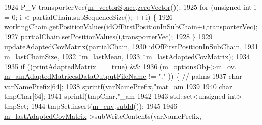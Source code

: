 \begin{DoxyCode}
1924         P\_V transporterVec(\hyperlink{class_q_u_e_s_o_1_1_metropolis_hastings_s_g_a2ef17fbfc6a156f03bbfad044b5a75f5}{m\_vectorSpace}.\hyperlink{class_q_u_e_s_o_1_1_vector_space_a92e963bb5cab3eecd290dfe4b8f03b04}{zeroVector}());
1925         \textcolor{keywordflow}{for} (\textcolor{keywordtype}{unsigned} \textcolor{keywordtype}{int} i = 0; i < partialChain.subSequenceSize(); ++i) \{
1926           workingChain.\hyperlink{class_q_u_e_s_o_1_1_base_vector_sequence_a656d47a18b401d6d914b0daf2dea88b0}{getPositionValues}(idOfFirstPositionInSubChain+i,transporterVec);
1927           partialChain.setPositionValues(i,transporterVec);
1928         \}
1929         \hyperlink{class_q_u_e_s_o_1_1_metropolis_hastings_s_g_a8b6571483a26c8ce1783519c43ed55a4}{updateAdaptedCovMatrix}(partialChain,
1930                                idOfFirstPositionInSubChain,
1931                                \hyperlink{class_q_u_e_s_o_1_1_metropolis_hastings_s_g_a005d221d1c458ff767ed03304ca4cd6f}{m\_lastChainSize},
1932                                *\hyperlink{class_q_u_e_s_o_1_1_metropolis_hastings_s_g_a9741f56d947e9d7967af91c6ea083b56}{m\_lastMean},
1933                                *\hyperlink{class_q_u_e_s_o_1_1_metropolis_hastings_s_g_a1c73b49339c8a1015d95a890d7882331}{m\_lastAdaptedCovMatrix});
1934 
1935         \textcolor{keywordflow}{if} ((printAdaptedMatrix                                       == \textcolor{keyword}{true}) &&
1936             (\hyperlink{class_q_u_e_s_o_1_1_metropolis_hastings_s_g_a5d0bc9f73d50d272aa6bfb5ef5939ef3}{m\_optionsObj}->\hyperlink{class_q_u_e_s_o_1_1_metropolis_hastings_s_g_options_a9d4792d9fc2dc5439b8ab489b0c236eb}{m\_ov}.
      \hyperlink{class_q_u_e_s_o_1_1_mh_options_values_ad131a1b5617e040b7602fbd6bf4a600e}{m\_amAdaptedMatricesDataOutputFileName} != \textcolor{stringliteral}{"."} )) \{ \textcolor{comment}{// palms}
1937           \textcolor{keywordtype}{char} varNamePrefix[64];
1938           sprintf(varNamePrefix,\textcolor{stringliteral}{"mat\_am%
1939 
1940           \textcolor{keywordtype}{char} tmpChar[64];
1941           sprintf(tmpChar,\textcolor{stringliteral}{"\_am%
1942 
1943           std::set<unsigned int> tmpSet;
1944           tmpSet.insert(\hyperlink{class_q_u_e_s_o_1_1_metropolis_hastings_s_g_ac8ea061e55b920e0c8f9bce5c3f20e52}{m\_env}.\hyperlink{class_q_u_e_s_o_1_1_base_environment_a6ae3174897a9b3a4c85fa18da5d4c16f}{subId}());
1945 
1946           \hyperlink{class_q_u_e_s_o_1_1_metropolis_hastings_s_g_a1c73b49339c8a1015d95a890d7882331}{m\_lastAdaptedCovMatrix}->subWriteContents(varNamePrefix,
}}
\end{DoxyCode}
